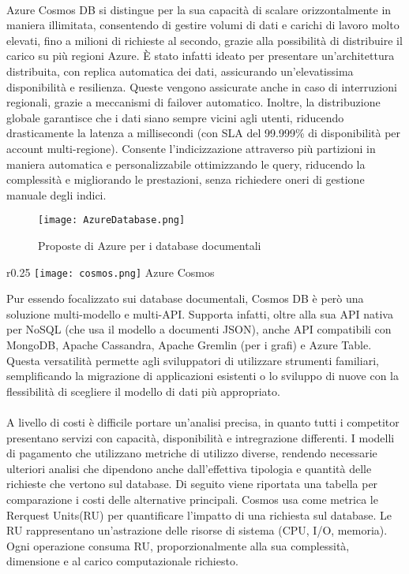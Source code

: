 \\
Azure Cosmos DB si distingue per la sua capacità di scalare orizzontalmente in maniera illimitata,
consentendo di gestire volumi di dati e carichi di lavoro molto elevati,
fino a milioni di richieste al secondo,
grazie alla possibilità di distribuire il carico su più regioni Azure.
È stato infatti ideato per presentare un'architettura distribuita,
con replica automatica dei dati,
assicurando un'elevatissima disponibilità e resilienza.
Queste vengono assicurate anche in caso di interruzioni regionali,
grazie a meccanismi di failover automatico.
Inoltre, la distribuzione globale garantisce che i dati siano sempre vicini agli utenti,
riducendo drasticamente la latenza a millisecondi
(con SLA del 99.999\% di disponibilità per account multi-regione).
Consente l'indicizzazione attraverso più partizioni in maniera
automatica e personalizzabile ottimizzando le query,
riducendo la complessità e migliorando le prestazioni,
senza richiedere oneri di gestione manuale degli indici.\\
\begin{figure}[h!]
    \centering
    \texttt{[image: AzureDatabase.png]}
    \caption{Proposte di Azure per i database documentali}
\end{figure}


\begin{wrapfigure}{r}{0.25\textwidth}
    \centering
    \texttt{[image: cosmos.png]}
    Azure Cosmos
\end{wrapfigure}
Pur essendo focalizzato sui database documentali,
Cosmos DB è però una soluzione multi-modello e multi-API.
Supporta infatti, oltre alla sua API nativa per NoSQL (che usa il modello a documenti JSON),
anche API compatibili con MongoDB, Apache Cassandra, Apache Gremlin (per i grafi) e Azure Table.
Questa versatilità permette agli sviluppatori di utilizzare strumenti familiari,
semplificando la migrazione di applicazioni esistenti o
lo sviluppo di nuove con la flessibilità di scegliere il modello di dati più appropriato.\\
\\
A livello di costi è difficile portare un'analisi precisa,
in quanto tutti i competitor presentano servizi
con capacità, disponibilità e intregrazione differenti.
I modelli di pagamento che utilizzano metriche di utilizzo diverse,
rendendo necessarie ulteriori analisi che dipendono anche
dall'effettiva tipologia e quantità delle richieste che vertono sul database.
Di seguito viene riportata una tabella per comparazione i costi delle alternative principali.
Cosmos usa come metrica le Rerquest Units(RU) per quantificare l'impatto di una richiesta sul database.
Le RU rappresentano un'astrazione delle risorse di sistema (CPU, I/O, memoria).
Ogni operazione consuma RU, proporzionalmente alla sua
complessità, dimensione e al carico computazionale richiesto.\\

